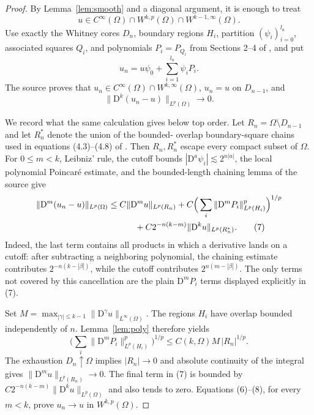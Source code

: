 \documentclass[11pt]{article}
\newcommand{\Om}{\Omega}
\newcommand{\D}{\mathrm D}
\begin{document}
\begin{proof}
By Lemma~\ref{lem:smooth} and a diagonal argument, it is enough to treat
\[
 u\in C^\infty(\Om)\cap W^{k,p}(\Om)\cap W^{k-1,\infty}(\Om).           \tag{4}
\]
Use exactly the Whitney cores $D_n$, boundary regions $H_i$, partition
$(\psi_i)_{i=0}^{l_n}$, associated squares $Q_i$, and polynomials
$P_i=P_{Q_i}$ from Sections 2--4 of \cite{NRS}, and put
\[
 u_n=u\psi_0+\sum_{i=1}^{l_n}\psi_iP_i.                               \tag{5}
\]
The source proves that $u_n\in C^\infty(\Om)\cap W^{k,\infty}(\Om)$,
$u_n=u$ on $D_{n-1}$, and
\[
                    \|\D^k(u_n-u)\|_{L^p(\Om)}\longrightarrow0.       \tag{6}
\]

We record what the same calculation gives below top order.  Let
$R_n=\Om\setminus D_{n-1}$ and let $R_n^*$ denote the union of the bounded-
overlap boundary-square chains used in equations (4.3)--(4.8) of \cite{NRS}.
Then $R_n,R_n^*$ escape every compact subset of $\Om$.  For $0\leq m<k$,
Leibniz' rule, the cutoff bounds
$|\D^a\psi_i|\lesssim2^{n|a|}$, the local polynomial Poincar\'e estimate,
and the bounded-length chaining lemma of the source give
\begin{align}
 \|\D^m(u_n-u)\|_{L^p(\Om)}
 &\leq C\|\D^m u\|_{L^p(R_n)}
       +C\Big(\sum_i\|\D^mP_i\|_{L^p(H_i)}^p\Big)^{1/p} \notag\\
 &\hspace{1.1cm}+C2^{-n(k-m)}\|\D^ku\|_{L^p(R_n^*)}.                  \tag{7}
\end{align}
Indeed, the last term contains all products in which a derivative lands on a
cutoff: after subtracting a neighboring polynomial, the chaining estimate
contributes $2^{-n(k-|\beta|)}$, while the cutoff contributes
$2^{n(m-|\beta|)}$.  The only terms not covered by this cancellation are the
plain $\D^mP_i$ terms displayed explicitly in (7).

Set
$M=\max_{|\gamma|\leq k-1}\|\D^\gamma u\|_{L^\infty(\Om)}$.  The regions
$H_i$ have overlap bounded independently of $n$.  Lemma~\ref{lem:poly}
therefore yields
\[
 \Big(\sum_i\|\D^mP_i\|_{L^p(H_i)}^p\Big)^{1/p}
 \leq C(k,\Om)M\,|R_n|^{1/p}.                                       \tag{8}
\]
The exhaustion $D_n\uparrow\Om$ implies $|R_n|\to0$ and absolute continuity
of the integral gives
$\|\D^m u\|_{L^p(R_n)}\to0$.  The final term in (7) is bounded by
$C2^{-n(k-m)}\|\D^ku\|_{L^p(\Om)}$ and also tends to zero.  Equations
(6)--(8), for every $m<k$, prove $u_n\to u$ in $W^{k,p}(\Om)$.
\end{proof}
\end{document}
